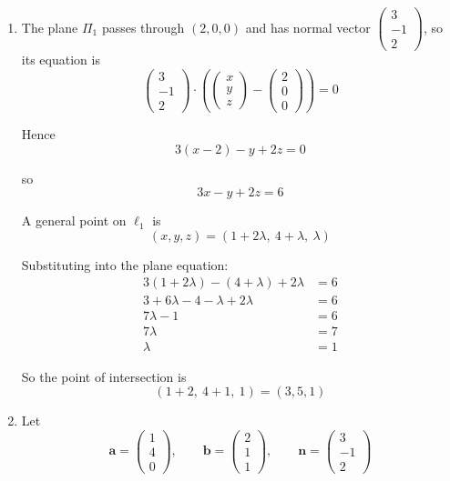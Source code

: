 \documentclass[leqno]{article}
\begin{document}
\begin{enumerate}[
  label=\textbf{\arabic*.},
  leftmargin=*,
  topsep=0pt,
  partopsep=0pt,
  parsep=0pt
]
\begin{djsSolution}
\begin{enumerate}[label=\textbf{(\alph*)}]
  \item The plane $\Pi_1$ passes through $(2,0,0)$ and has normal vector $\begin{pmatrix}3\\-1\\2\end{pmatrix}$, so its equation is
\[
\begin{pmatrix}3\\-1\\2\end{pmatrix}\cdot
\left(
\begin{pmatrix}x\\y\\z\end{pmatrix}
-
\begin{pmatrix}2\\0\\0\end{pmatrix}
\right)=0
\]

Hence
\[
3(x-2)-y+2z=0
\]

so
\[
3x-y+2z=6
\]

A general point on $\ell_1$ is
\[
(x,y,z)=(1+2\lambda,\ 4+\lambda,\ \lambda)
\]

Substituting into the plane equation:
\begin{align*}
3(1+2\lambda)-(4+\lambda)+2\lambda&=6\\
3+6\lambda-4-\lambda+2\lambda&=6\\
7\lambda-1&=6\\
7\lambda&=7\\
\lambda&=1
\end{align*}

So the point of intersection is
\[
(1+2,\ 4+1,\ 1)=(3,5,1)
\]

  \item Let
\[
\mathbf a=\begin{pmatrix}1\\4\\0\end{pmatrix},
\qquad
\mathbf b=\begin{pmatrix}2\\1\\1\end{pmatrix},
\qquad
\mathbf n=\begin{pmatrix}3\\-1\\2\end{pmatrix}
\]


\end{enumerate}
\end{djsSolution}
\end{enumerate}
\end{document}
